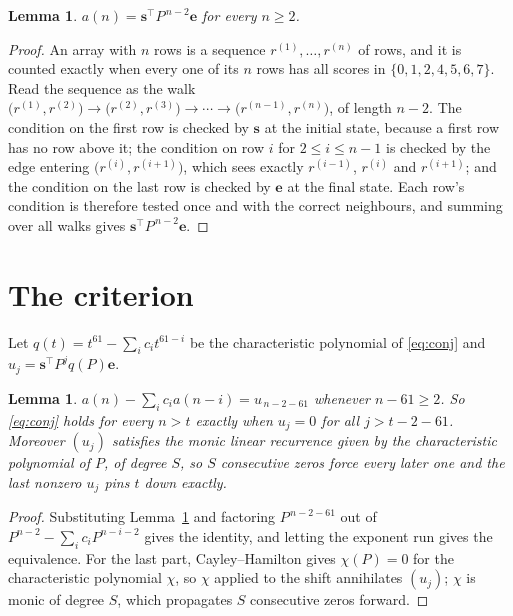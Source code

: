 \documentclass[11pt,a4paper]{article}
\theoremstyle{plain}
\newtheorem{lemma}[theorem]{Lemma}
\theoremstyle{definition}
\begin{document}
\begin{lemma}\label{lem:walk}
$a(n)=\mathbf{s}^{\!\top}P^{\,n-2}\mathbf{e}$ for every $n\ge2$.
\end{lemma}

\begin{proof}
An array with $n$ rows is a sequence $r^{(1)},\dots,r^{(n)}$ of rows, and it is counted
exactly when every one of its $n$ rows has all scores in $\{0,1,2,4,5,6,7\}$. Read the sequence as the
walk $\bigl(r^{(1)},r^{(2)}\bigr)\to\bigl(r^{(2)},r^{(3)}\bigr)\to\cdots\to
\bigl(r^{(n-1)},r^{(n)}\bigr)$, of length $n-2$. The condition on the first row is
checked by $\mathbf{s}$ at the initial state, because a first row has no row above it; the
condition on row $i$ for $2\le i\le n-1$ is checked by the edge entering
$\bigl(r^{(i)},r^{(i+1)}\bigr)$, which sees exactly $r^{(i-1)}$, $r^{(i)}$ and
$r^{(i+1)}$; and the condition on the last row is checked by $\mathbf{e}$ at the final
state. Each row's condition is therefore tested once and with the correct neighbours, and
summing over all walks gives $\mathbf{s}^{\!\top}P^{\,n-2}\mathbf{e}$.
\end{proof}

\section{The criterion}

Let $q(t)=t^{61}-\sum_i c_i t^{61-i}$ be the characteristic polynomial of
\eqref{eq:conj} and $u_j=\mathbf{s}^{\!\top}P^{j}q(P)\mathbf{e}$.

\begin{lemma}\label{lem:crit}
$a(n)-\sum_i c_i a(n-i)=u_{\,n-2-61}$ whenever $n-61\ge2$. So \eqref{eq:conj}
holds for every $n>t$ exactly when $u_j=0$ for all $j>t-2-61$. Moreover $(u_j)$
satisfies the monic linear recurrence given by the characteristic polynomial of $P$, of
degree $S$, so $S$ consecutive zeros force every later one and the last nonzero $u_j$ pins
$t$ down exactly.
\end{lemma}

\begin{proof}
Substituting Lemma~\ref{lem:walk} and factoring $P^{\,n-2-61}$ out of
$P^{n-2}-\sum_i c_i P^{n-i-2}$ gives the identity, and letting the exponent run gives the
equivalence. For the last part, Cayley--Hamilton gives $\chi(P)=0$ for the characteristic
polynomial $\chi$, so $\chi$ applied to the shift annihilates $(u_j)$; $\chi$ is monic of
degree $S$, which propagates $S$ consecutive zeros forward.
\end{proof}
\end{document}
